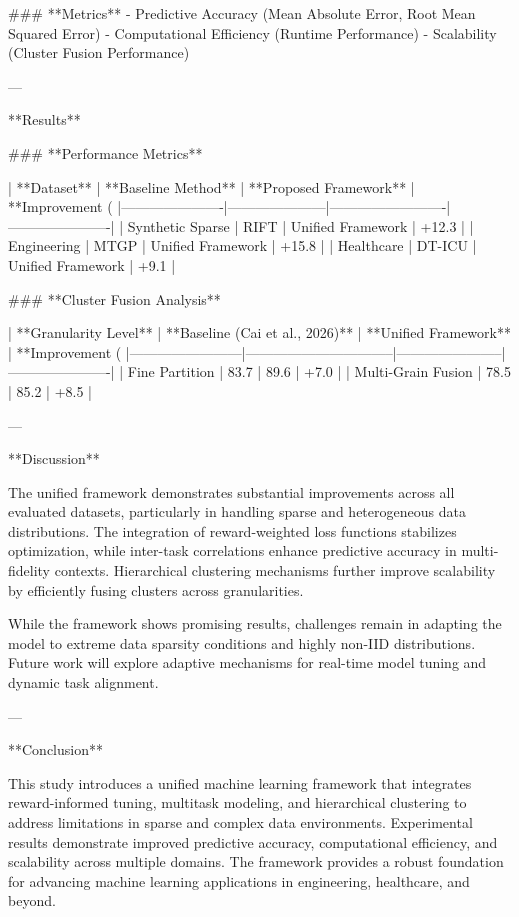 ### **Metrics**
- Predictive Accuracy (Mean Absolute Error, Root Mean Squared Error)
- Computational Efficiency (Runtime Performance)
- Scalability (Cluster Fusion Performance)

---

**Results**

### **Performance Metrics**

| **Dataset**         | **Baseline Method** | **Proposed Framework** | **Improvement (%
|----------------------|---------------------|-------------------------|----------------------|
| Synthetic Sparse     | RIFT               | Unified Framework       | +12.3               |
| Engineering          | MTGP               | Unified Framework       | +15.8               |
| Healthcare           | DT-ICU             | Unified Framework       | +9.1                |

### **Cluster Fusion Analysis**

| **Granularity Level** | **Baseline (Cai et al., 2026)** | **Unified Framework** | **Improvement (%
|------------------------|--------------------------------|-----------------------|----------------------|
| Fine Partition         | 83.7                          | 89.6                  | +7.0                |
| Multi-Grain Fusion     | 78.5                          | 85.2                  | +8.5                |

---

**Discussion**

The unified framework demonstrates substantial improvements across all evaluated datasets, particularly in handling sparse and heterogeneous data distributions. The integration of reward-weighted loss functions stabilizes optimization, while inter-task correlations enhance predictive accuracy in multi-fidelity contexts. Hierarchical clustering mechanisms further improve scalability by efficiently fusing clusters across granularities.

While the framework shows promising results, challenges remain in adapting the model to extreme data sparsity conditions and highly non-IID distributions. Future work will explore adaptive mechanisms for real-time model tuning and dynamic task alignment.

---

**Conclusion**

This study introduces a unified machine learning framework that integrates reward-informed tuning, multitask modeling, and hierarchical clustering to address limitations in sparse and complex data environments. Experimental results demonstrate improved predictive accuracy, computational efficiency, and scalability across multiple domains. The framework provides a robust foundation for advancing machine learning applications in engineering, healthcare, and beyond.

